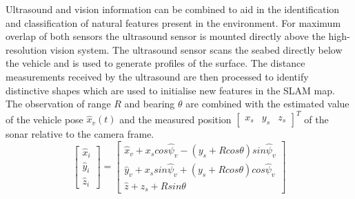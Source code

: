 Ultrasound and vision information can be combined to aid in the identification and classification of natural features present in the environment.
For maximum overlap of both sensors the ultrasound sensor is mounted directly above the high-resolution vision system.
The ultrasound sensor scans the seabed directly below the vehicle and is used to generate
profiles of the surface.
The distance measurements received by the ultrasound are then processed to identify distinctive shapes which are used to initialise new features in the SLAM map.
The observation of range $R$ and bearing $\theta$ are combined with the estimated value of the vehicle pose $\hat{x}_v(t)$ and the measured position
$\left[ \begin{array}{ccc} \textit{x}_s & \textit{y}_s & \textit{z}_s \end{array}\right]^T$ of the sonar relative to the camera frame.
\begin{equation}
\left[ {
\begin{array}{c} \hat{\textit{x}}_i \\ \hat{\textit{y}}_i \\ \hat{\textit{z}}_i \end{array}
} \right] =
\left[ {
\begin{array}{c}
	\hat{\textit{x}}_v + \textit{x}_s cos \hat{\psi}_v - (\textit{y}_s + R cos \theta) sin \hat{\psi}_v \\
	\hat{\textit{y}}_v + \textit{x}_s sin \hat{\psi}_v + (\textit{y}_s + R cos \theta) cos \hat{\psi}_v \\
	\hat{\textit{z}} + \textit{z}_s + R sin \theta
\end{array}
} \right]
\end{equation}

